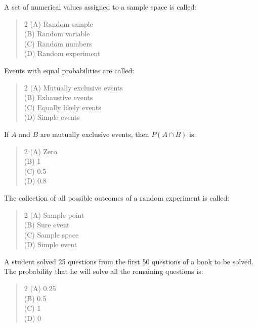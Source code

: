 \documentclass[11pt,a4paper]{article}
\begin{document}
\begin{mcqlist}
\item A set of numerical values assigned to a sample space is called:
\begin{quote}\begin{multicols}{2}
\noindent (A) Random sample \\
(B) Random variable \\
(C) Random numbers \\
(D) Random experiment
\end{multicols}\end{quote}

\item Events with equal probabilities are called:
\begin{quote}\begin{multicols}{2}
\noindent (A) Mutually exclusive events \\
(B) Exhaustive events \\
(C) Equally likely events \\
(D) Simple events
\end{multicols}\end{quote}

\item If $A$ and $B$ are mutually exclusive events, then $P(A\cap B)$ is:
\begin{quote}\begin{multicols}{2}
\noindent (A) Zero \\
(B) 1 \\
(C) 0.5 \\
(D) 0.8
\end{multicols}\end{quote}

\item The collection of all possible outcomes of a random experiment is called:
\begin{quote}\begin{multicols}{2}
\noindent (A) Sample point \\
(B) Sure event \\
(C) Sample space \\
(D) Simple event
\end{multicols}\end{quote}

\item A student solved 25 questions from the first 50 questions of a book to be solved. The probability that he will solve all the remaining questions is:
\begin{quote}\begin{multicols}{2}
\noindent (A) 0.25 \\
(B) 0.5 \\
(C) 1 \\
(D) 0
\end{multicols}\end{quote}


\end{mcqlist}
\end{document}
